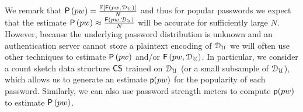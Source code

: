 We remark that $\mathsf{P}\left(pw\right) = \frac{\mathbb{E}\left[ \mathsf{F}\left(pw,  \mathcal{D}_{{\mathcal{U}}}\right)\right]}{N}$ and thus for popular passwords we expect that the estimate $\mathsf{P}\left(pw\right) \approx  \frac{\mathsf{F}\left(pw, \mathcal{D}_{{\mathcal{U}}}\right)}{N}$ will be accurate for sufficiently large $N$. However, because the underlying password distribution is unknown and an authentication server cannot store a plaintext encoding of $\mathcal{D}_{{\mathcal{U}}}$ we will often use other techniques to estimate  $\mathsf{P}\left(pw\right)$ and/or $\mathsf{F}\left(pw, \mathcal{D}_{{\mathcal{U}}}\right)$. In particular, we consider a count sketch data structure $\mathsf{CS}$ trained on $\mathcal{D}_{{\mathcal{U}}}$ (or a small subsample of $\mathcal{D}_{{\mathcal{U}}}$), which allows us to generate an estimate $\textsf{p}(pw)$ for the popularity of each password. Similarly, we can also use password strength meters to compute $\textsf{p}(pw)$ to estimate $\mathsf{P}\left(pw\right)$.



